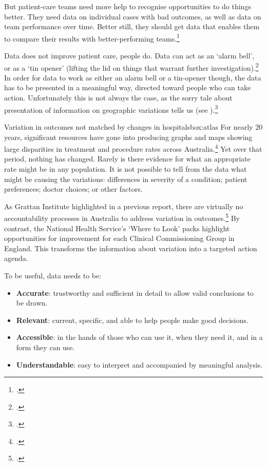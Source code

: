 \documentclass[FrontPage]{grattan}
\begin{document}
But patient-care teams need more help to recognise opportunities to do things better. They need data on individual cases with bad outcomes, as well as data on team performance over time. Better still, they should get data that enables them to compare their results with better-performing teams.\footcites{RN10}{RN9}

Data does not improve patient care, people do. Data can act as an ‘alarm bell’, or as a ‘tin opener’ (lifting the lid on things that warrant further investigation).\footcite{RN11}
In order for data to work as either an alarm bell or a tin-opener though, the data has to be presented in a meaningful way, directed toward people who can take action. Unfortunately this is not always the case, as the sorry tale about presentation of information on geographic variations tells us (see ).\footcite{evans1990dog}

\begin{smallbox}{Variation in outcomes not matched by changes in hospitals}{box:atlas}
For nearly 20 years, significant resources have gone into producing graphs and maps showing large disparities in treatment and procedure rates across Australia.\footcite{richardson1998health}
Yet over that period, nothing has changed. Rarely is there evidence for what an appropriate rate might be in any population. It is not possible to tell from the data what might be causing the variations: differences in severity of a condition; patient preferences; doctor choices; or other factors.

As Grattan Institute highlighted in a previous report, there are virtually no accountability processes in Australia to address variation in outcomes.\footcite{DuckettEtAl-2015-Questionable-care}
By contrast, the National Health Service’s ‘Where to Look’ packs highlight opportunities for improvement for each Clinical Commissioning Group in England. This transforms the information about variation into a targeted action agenda.

\end{smallbox}

To be useful, data needs to be:
\begin{itemize}
    \item \textbf{Accurate}: trustworthy and sufficient in detail to allow valid conclusions to be drawn.
    \item \textbf{Relevant}: current, specific, and able to help people make good decisions.
    \item \textbf{Accessible}: in the hands of those who can use it, when they need it, and in a form they can use.
    \item \textbf{Understandable}: easy to interpret and accompanied by meaningful analysis.
\end{itemize}
\end{document}
